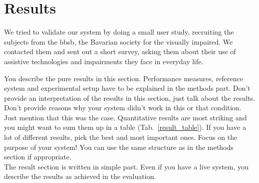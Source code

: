 \section{Results}
We tried to validate our system by doing a small user study, recruiting the subjects from the \ac{bbsb}, the Bavarian society for the visually impaired.
We contacted them and sent out a short survey, asking them about their use of assistive technologies and impairments they face in everyday life.

You describe the pure results in this section. Performance measures, reference system and experimental setup have to be explained in the methods part. Don't provide an interpretation of the results in this section, just talk about the results. Don't provide reasons why your system didn't work in this or that condition. Just mention that this was the case. Quantitative results are most striking and you might want to sum them up in a table (Tab.~\ref{result_table}). If you have a lot of different results, pick the best and most important ones. Focus on the purpose of your system! You can use the same structure as in the methods section if appropriate.\\
The result section is written in simple past. Even if you have a live system, you describe the results as achieved in the evaluation. 

